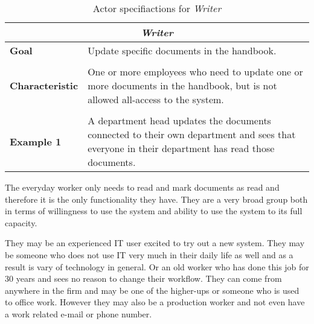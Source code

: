 \begin{table}[H]
	\begin{tabular}{l p{11.3cm}}
		\hline
		\multicolumn{2}{c}{\textbf{\textit{Writer}}}\\
		\hline
		
		\textbf{Goal} & Update specific documents in the handbook. \\
	 	 &  \\
	 	 
		\textbf{Characteristic} &  One or more employees who need to update one or more documents in the handbook, but is not allowed all-access to the system. \\
		 &  \\
		 
		\textbf{Example 1} 
		& A department head updates the documents connected to their own department and sees that everyone in their department has read those documents.\\
		
		\hline
	\end{tabular}
	\caption{Actor specifiactions for \textit{Writer}}\label{tab:Actor-write}
\end{table}

The everyday worker only needs to read and mark documents as read and therefore it is the only functionality they have.
They are a very broad group both in terms of willingness to use the system and ability to use the system to its full capacity.

They may be an experienced IT user excited to try out a new system.
They may be someone who does not use IT very much in their daily life as well and as a result is vary of technology in general.
Or an old worker who has done this job for 30 years and sees no reason to change their workflow.
They can come from anywhere in the firm and may be one of the higher-ups or someone who is used to office work.
However they may also be a production worker and not even have a work related e-mail or phone number.

